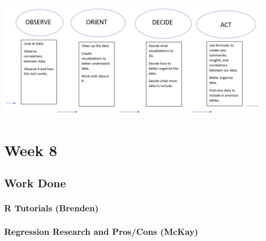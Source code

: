 \documentclass[]{article}
\begin{document}
\includegraphics{../images/ooda.png}

\hypertarget{week-8}{%
\section{Week 8}\label{week-8}}

\hypertarget{work-done}{%
\subsection{Work Done}\label{work-done}}

\hypertarget{r-tutorials-brenden}{%
\subsubsection{R Tutorials (Brenden)}\label{r-tutorials-brenden}}

\hypertarget{regression-research-and-proscons-mckay}{%
\subsubsection{Regression Research and Pros/Cons
(McKay)}\label{regression-research-and-proscons-mckay}}
\end{document}

